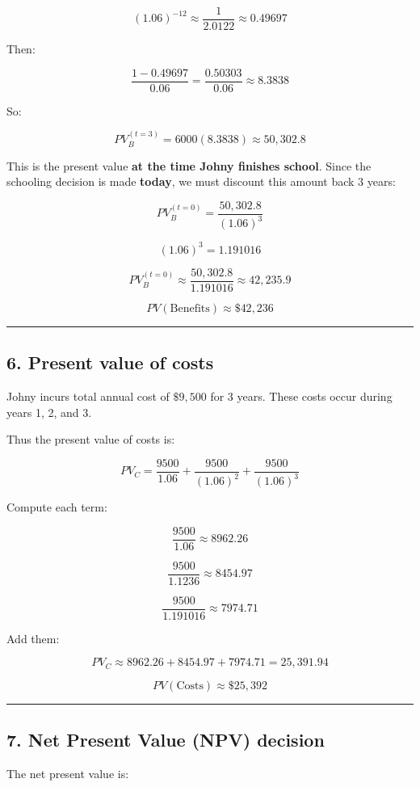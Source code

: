 \documentclass[12pt]{article}
\begin{document}
\[
(1.06)^{-12} \approx \frac{1}{2.0122} \approx 0.49697
\]

Then:

\[
\frac{1-0.49697}{0.06} = \frac{0.50303}{0.06} \approx 8.3838
\]

So:

\[
PV_B^{(t=3)} = 6000(8.3838) \approx 50{,}302.8
\]

This is the present value \textbf{at the time Johny finishes school}. Since the schooling decision is made \textbf{today}, we must discount this amount back 3 years:

\[
PV_B^{(t=0)} = \frac{50{,}302.8}{(1.06)^3}
\]

\[
(1.06)^3 = 1.191016
\]

\[
PV_B^{(t=0)} \approx \frac{50{,}302.8}{1.191016} \approx 42{,}235.9
\]

\[
\boxed{PV(\text{Benefits}) \approx \$42{,}236}
\]

\hrule
\vspace{0.5em}

\subsection*{6. Present value of costs}

Johny incurs total annual cost of \(\$9{,}500\) for 3 years. These costs occur during years 1, 2, and 3.

Thus the present value of costs is:

\[
PV_C = \frac{9500}{1.06} + \frac{9500}{(1.06)^2} + \frac{9500}{(1.06)^3}
\]

Compute each term:

\[
\frac{9500}{1.06} \approx 8962.26
\]

\[
\frac{9500}{1.1236} \approx 8454.97
\]

\[
\frac{9500}{1.191016} \approx 7974.71
\]

Add them:

\[
PV_C \approx 8962.26 + 8454.97 + 7974.71 = 25{,}391.94
\]

\[
\boxed{PV(\text{Costs}) \approx \$25{,}392}
\]

\hrule
\vspace{0.5em}

\subsection*{7. Net Present Value (NPV) decision}

The net present value is:
\end{document}
